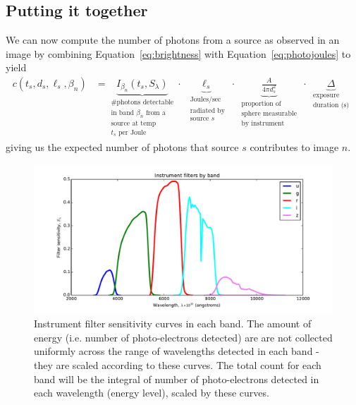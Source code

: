 \documentclass[11pt]{article}
\begin{document}
\subsection{Putting it together}
We can now compute the number of photons from a source as observed in an image by combining Equation~\ref{eq:brightness} with Equation~\ref{eq:photojoules} to yield
\begin{align}\label{eq:photosource}
  c(t_s, d_s, \ell_s, \beta_n) &= 
    \underbrace{I_{\beta_n}(t_s, S_\lambda)}_{
      \substack{ \text{\# photons detectable} \\
                 \text{in band $\beta_n$ from a } \\
                 \text{source at temp} \\
                 \text{$t_s$ per Joule}}} \cdot 
    \underbrace{ \ell_s }_{
      \substack{ \text{ Joules/sec } \\
                 \text{ radiated by} \\
                 \text{ source $s$ } }} \cdot
    \underbrace{ \frac{A}{4\pi d_s^2} }_{
      \substack{ \text{ proportion of } \\
                 \text{ sphere measurable } \\
                 \text{ by instrument }}} \cdot
    \underbrace{ \Delta }_{
      \substack{ \text{ exposure } \\
                 \text{ duration (s) } } }
\end{align}
giving us the expected number of photons that source $s$ contributes to image $n$.  

\begin{figure}[t!]
\includegraphics[width=\textwidth]{imgs/filter_sensitivity.pdf}
\caption{Instrument filter sensitivity curves in each band.  The amount of energy (i.e. number of photo-electrons detected) are are not collected uniformly across the range of wavelengths detected in each band - they are scaled according to these curves.  The total count for each band will be the integral of number of photo-electrons detected in each wavelength (energy level), scaled by these curves. }
\label{fig:sensitivity}
\end{figure}
\end{document}
